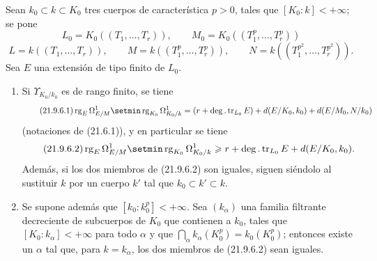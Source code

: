 \begin{proposition}[21.9.6]
\label{0.21.9.6-fr}
Sean $k_0\subset k\subset K_0$ tres cuerpos de característica $p>0$, tales
que $[K_0:k]<+\infty$; se pone
\[
  L_0=K_0((T_1,\ldots,T_r)),\qquad
  M_0=K_0((T_1^p,\ldots,T_r^p))
\]
\[
  L=k((T_1,\ldots,T_r)),\qquad
  M=k((T_1^p,\ldots,T_r^p)),\qquad
  N=k((T_1^{p^2},\ldots,T_r^{p^2})).
\]
Sea $E$ una extensión de tipo finito de $L_0$.
\begin{enumerate}
  \item[\textup{(i)}] Si $\Upsilon_{K_0/k_0}$ es de rango finito, se tiene
  \begin{equation}
  \tag{21.9.6.1}
  \label{0.21.9.6.1-fr}
    \operatorname{rg}_E\Omega^1_{E/M}
    \setmin\operatorname{rg}_{K_0}\Omega^1_{K_0/k}
    =(r+\deg.\operatorname{tr}_{L_0}E)
      +d(E/K_0,k_0)+d(E/M_0,N/k_0)
  \end{equation}
  (notaciones de (21.6.1)), y en particular se tiene
  \begin{equation}
  \tag{21.9.6.2}
  \label{0.21.9.6.2-fr}
    \operatorname{rg}_E\Omega^1_{E/M}
    \setmin\operatorname{rg}_{K_0}\Omega^1_{K_0/k}
    \geqslant r+\deg.\operatorname{tr}_{L_0}E+d(E/K_0,k_0).
  \end{equation}
  Además, si los dos miembros de (21.9.6.2) son iguales, siguen siéndolo al
  sustituir $k$ por un cuerpo $k'$ tal que $k_0\subset k'\subset k$.

  \item[\textup{(ii)}] Se supone además que $[k_0:k_0^p]<+\infty$. Sea
  $(k_\alpha)$ una familia filtrante decreciente de subcuerpos de $K_0$ que
  contienen a $k_0$, tales que $[K_0:k_\alpha]<+\infty$ para todo $\alpha$ y
  que $\bigcap_\alpha k_\alpha(K_0^p)=k_0(K_0^p)$; entonces existe un
  $\alpha$ tal que, para $k=k_\alpha$, los dos miembros de (21.9.6.2) sean
  iguales.
\end{enumerate}
\end{proposition}


